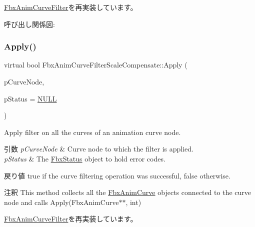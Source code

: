\hyperlink{class_fbx_anim_curve_filter_a009498a65af4995bf5e5908f17837531}{Fbx\+Anim\+Curve\+Filter}を再実装しています。

呼び出し関係図\+:
\mbox{\label{class_fbx_anim_curve_filter_scale_compensate_a1e2bc6474043beb0b41a85b2d70fde76}} 
\subsubsection{\texorpdfstring{Apply()}{Apply()}\hspace{0.1cm}{\footnotesize\ttfamily [3/6]}}
{\footnotesize\ttfamily virtual bool Fbx\+Anim\+Curve\+Filter\+Scale\+Compensate\+::\+Apply (\begin{DoxyParamCaption}\item[{\hyperlink{class_fbx_anim_curve_node}{Fbx\+Anim\+Curve\+Node} \&}]{p\+Curve\+Node,  }\item[{\hyperlink{class_fbx_status}{Fbx\+Status} $\ast$}]{p\+Status = {\ttfamily \hyperlink{fbxarch_8h_a070d2ce7b6bb7e5c05602aa8c308d0c4}{N\+U\+LL}} }\end{DoxyParamCaption})\hspace{0.3cm}{\ttfamily [virtual]}}

Apply filter on all the curves of an animation curve node. 
\begin{DoxyParams}{引数}
{\em p\+Curve\+Node} & Curve node to which the filter is applied. \\
\hline
{\em p\+Status} & The \hyperlink{class_fbx_status}{Fbx\+Status} object to hold error codes. \\
\hline
\end{DoxyParams}
\begin{DoxyReturn}{戻り値}
{\ttfamily true} if the curve filtering operation was successful, {\ttfamily false} otherwise. 
\end{DoxyReturn}
\begin{DoxyRemark}{注釈}
This method collects all the \hyperlink{class_fbx_anim_curve}{Fbx\+Anim\+Curve} objects connected to the curve node and calls Apply(\+Fbx\+Anim\+Curve$\ast$$\ast$, int) 
\end{DoxyRemark}


\hyperlink{class_fbx_anim_curve_filter_ad042b45c0675278fa49e61739b0825c2}{Fbx\+Anim\+Curve\+Filter}を再実装しています。

